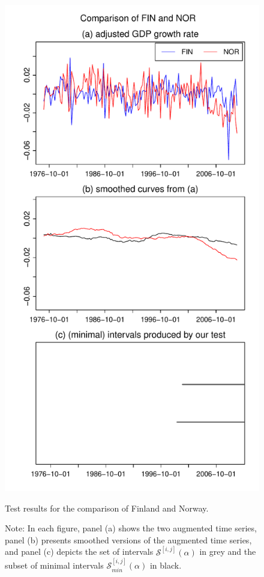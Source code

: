 \documentclass[a4paper,12pt]{article}
\begin{document}
\begin{figure}[t!]
\begin{minipage}[t]{0.49\textwidth}
\includegraphics[width=\textwidth]{Plots/gdp/FIN_vs_NOR}
\caption{Test results for the comparison of Finland and Norway.}\label{fig:Finland:Norway}
\end{minipage}
\caption*{Note: In each figure, panel (a) shows the two augmented time series, panel (b) presents smoothed versions of the augmented time series, and panel (c) depicts the set of intervals $\mathcal{S}^{[i, j]}(\alpha)$ in grey and the subset of minimal intervals $\mathcal{S}^{[i, j]}_{min}(\alpha)$ in black.}
\end{figure}
\end{document}
